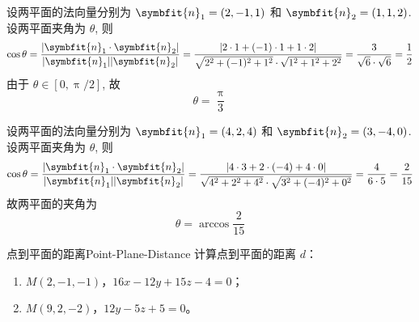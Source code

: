 \begin{solution}
    设两平面的法向量分别为 $\symbfit{n}_1 = (2, -1, 1)$ 和 $\symbfit{n}_2 = (1, 1, 2)$. 设两平面夹角为 $\theta$, 则
    \begin{equation}
        \cos \theta = \frac{|\symbfit{n}_1 \cdot \symbfit{n}_2|}{|\symbfit{n}_1||\symbfit{n}_2|} = \frac{|2 \cdot 1 + (-1) \cdot 1 + 1 \cdot 2|}{\sqrt{2^2 + (-1)^2 + 1^2} \cdot \sqrt{1^2 + 1^2 + 2^2}} = \frac{3}{\sqrt{6} \cdot \sqrt{6}} = \frac{1}{2}
    \end{equation}
    由于 $\theta \in [0, \uppi/2]$, 故
    \begin{equation}
        \boxed{\theta = \frac{\uppi}{3}}
    \end{equation}

    设两平面的法向量分别为 $\symbfit{n}_1 = (4, 2, 4)$ 和 $\symbfit{n}_2 = (3, -4, 0)$. 设两平面夹角为 $\theta$, 则
    \begin{equation}
        \cos \theta = \frac{|\symbfit{n}_1 \cdot \symbfit{n}_2|}{|\symbfit{n}_1||\symbfit{n}_2|} = \frac{|4 \cdot 3 + 2 \cdot (-4) + 4 \cdot 0|}{\sqrt{4^2 + 2^2 + 4^2} \cdot \sqrt{3^2 + (-4)^2 + 0^2}} = \frac{4}{6 \cdot 5} = \frac{2}{15}
    \end{equation}
    故两平面的夹角为
    \begin{equation}
        \boxed{\theta = \arccos \frac{2}{15}}
    \end{equation}
\end{solution}


\begin{problem}{点到平面的距离}{Point-Plane-Distance}
    计算点到平面的距离 $d$：
    \begin{enumerate}
        \item $M(2, -1, -1)$，$16x - 12y + 15z - 4 = 0$；
        \item $M(9, 2, -2)$，$12y - 5z + 5 = 0$。
    \end{enumerate}
\end{problem}


